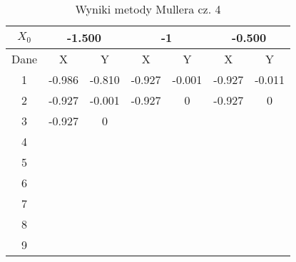 \documentclass[a4paper, 11pt]{article}
\begin{document}
\begin{enumerate}
\begin{itemize}
\begin{table}[p]                                                 
\centering                                                    
\begin{tabular}{|c|c|c|c|c|c|c|}                              
\hline                                                        
\( X_0 \)  & \multicolumn{2}{c|}{-1.500 } & \multicolumn{2}{c|}{-1 }& \multicolumn{2}{c|}{-0.500}\\  
\hline                                                        
Dane & X & Y & X & Y & X & Y \\                              
\hline                                                        
1  & -0.986 & -0.810 & -0.927 & -0.001 & -0.927 & -0.011 \\
\hline                                                        
2  & -0.927 & -0.001 & -0.927 & 0  & -0.927 & 0 \\
\hline                                                        
3  & -0.927 &  0 &  &  &  &  \\    
\hline                                                        
4  &  &  &  &  &  &  \\      
\hline                                                        
5  &  &  &  &  &  &  \\      
\hline                                                        
6  &  &  &  &  &  &  \\      
\hline                                                        
7  &  &  &  &  &  &  \\      
\hline                                                        
8  &  &  &  &  &  &  \\      
\hline                                                        
9  &  &  &  &  &  &  \\      
\hline                                                        
\end{tabular}                                                 
\caption{Wyniki metody Mullera cz. 4}                         
\label{table:Wyniki metody Mullera cz. 4}                     
\end{table}                                                   
\begin{table}[p]                                                                           
\centering                                                                              
\begin{tabular}{|c|c|c|c|c|c|c|}                                                        

\end{tabular}
\end{table}
\end{itemize}
\end{enumerate}
\end{document}
